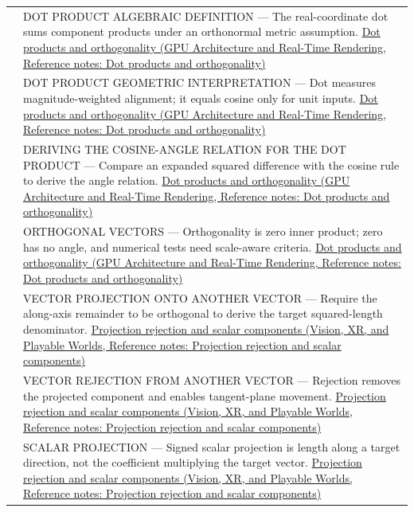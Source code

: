 {\begin{longtable}[]{@{}
  >{\raggedright\arraybackslash}p{}
  >{\raggedright\arraybackslash}p{}@{}}
534 & DOT PRODUCT ALGEBRAIC DEFINITION --- The real-coordinate dot sums component products under an orthonormal metric assumption. \href{../06-GPU-Architecture-and-Real-Time-Rendering/main.pdf\#nameddest=appendix-8bc4e8fc547c}{Dot products and orthogonality (GPU Architecture and Real-Time Rendering, Reference notes: Dot products and orthogonality)} \\
535 & DOT PRODUCT GEOMETRIC INTERPRETATION --- Dot measures magnitude-weighted alignment; it equals cosine only for unit inputs. \href{../06-GPU-Architecture-and-Real-Time-Rendering/main.pdf\#nameddest=appendix-8bc4e8fc547c}{Dot products and orthogonality (GPU Architecture and Real-Time Rendering, Reference notes: Dot products and orthogonality)} \\
536 & DERIVING THE COSINE-ANGLE RELATION FOR THE DOT PRODUCT --- Compare an expanded squared difference with the cosine rule to derive the angle relation. \href{../06-GPU-Architecture-and-Real-Time-Rendering/main.pdf\#nameddest=appendix-8bc4e8fc547c}{Dot products and orthogonality (GPU Architecture and Real-Time Rendering, Reference notes: Dot products and orthogonality)} \\
537 & ORTHOGONAL VECTORS --- Orthogonality is zero inner product; zero has no angle, and numerical tests need scale-aware criteria. \href{../06-GPU-Architecture-and-Real-Time-Rendering/main.pdf\#nameddest=appendix-8bc4e8fc547c}{Dot products and orthogonality (GPU Architecture and Real-Time Rendering, Reference notes: Dot products and orthogonality)} \\
538 & VECTOR PROJECTION ONTO ANOTHER VECTOR --- Require the along-axis remainder to be orthogonal to derive the target squared-length denominator. \href{../07-Vision-XR-and-Playable-Worlds/main.pdf\#nameddest=appendix-505a502c372a}{Projection rejection and scalar components (Vision, XR, and Playable Worlds, Reference notes: Projection rejection and scalar components)} \\
539 & VECTOR REJECTION FROM ANOTHER VECTOR --- Rejection removes the projected component and enables tangent-plane movement. \href{../07-Vision-XR-and-Playable-Worlds/main.pdf\#nameddest=appendix-505a502c372a}{Projection rejection and scalar components (Vision, XR, and Playable Worlds, Reference notes: Projection rejection and scalar components)} \\
540 & SCALAR PROJECTION --- Signed scalar projection is length along a target direction, not the coefficient multiplying the target vector. \href{../07-Vision-XR-and-Playable-Worlds/main.pdf\#nameddest=appendix-505a502c372a}{Projection rejection and scalar components (Vision, XR, and Playable Worlds, Reference notes: Projection rejection and scalar components)} \\

\end{longtable}}
